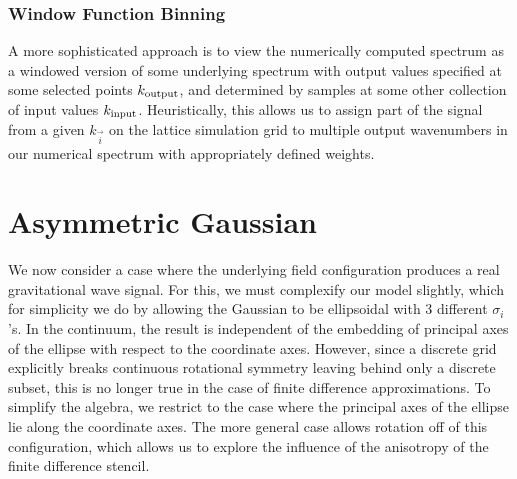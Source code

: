 \documentclass{revtex4}
\begin{document}
\subsubsection{Window Function Binning}
A more sophisticated approach is to view the numerically computed spectrum as a windowed version of some underlying spectrum with output values specified at some selected points $k_{\rm output}$, and determined by samples at some other collection of input values $k_{\rm input}$.
Heuristically, this allows us to assign part of the signal from a given $k_{\vec{i}}$ on the lattice simulation grid to multiple output wavenumbers in our numerical spectrum with appropriately defined weights.


\section{Asymmetric Gaussian}
We now consider a case where the underlying field configuration produces a real gravitational wave signal.
For this, we must complexify our model slightly, which for simplicity we do by allowing the Gaussian to be ellipsoidal with 3 different $\sigma_i$'s.
In the continuum, the result is independent of the embedding of principal axes of the ellipse with respect to the coordinate axes.
However, since a discrete grid explicitly breaks continuous rotational symmetry leaving behind only a discrete subset, this is no longer true in the case of finite difference approximations.
To simplify the algebra, we restrict to the case where the principal axes of the ellipse lie along the coordinate axes.
The more general case allows rotation off of this configuration, which allows us to explore the influence of the anisotropy of the finite difference stencil.
\end{document}
